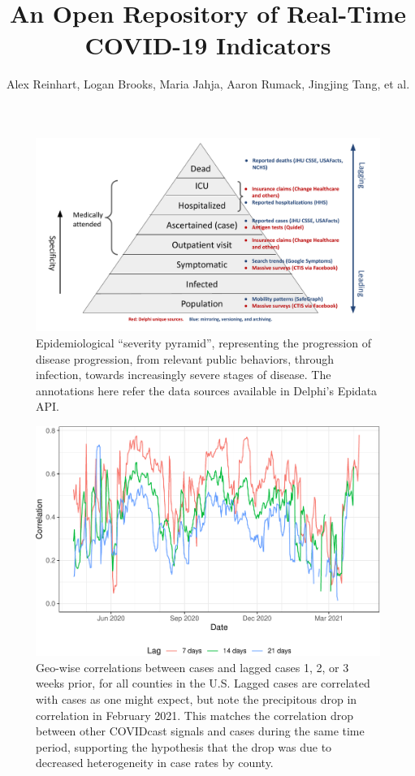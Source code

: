 \documentclass[9pt,twoside,lineno]{pnas-new}
\title{An Open Repository of Real-Time COVID-19 Indicators}
\author{Alex Reinhart, Logan Brooks, Maria Jahja, Aaron Rumack, Jingjing Tang,
  et al.}
\begin{document}
\maketitle

\begin{figure}
\includegraphics[width=\textwidth]{fig/severity-pyramid.pdf}
\caption{Epidemiological ``severity pyramid'', representing the progression of disease progression, from relevant public behaviors, through infection, towards increasingly severe stages of disease. The annotations here refer the data sources available in Delphi's Epidata API.}
\label{fig:severity-pyramid}
\end{figure}

\clearpage

\begin{figure}

{\centering \includegraphics[width=\textwidth]{fig/case-correlation-lagged-plot-1} 

}

\caption{Geo-wise correlations between cases and lagged cases 1, 2, or 3 weeks prior, for all counties in the U.S. Lagged cases are correlated with cases as one might expect, but note the precipitous drop in correlation in February 2021. This matches the correlation drop between other COVIDcast signals and cases during the same time period, supporting the hypothesis that the drop was due to decreased heterogeneity in case rates by county.}\label{fig:case-correlation-lagged-plot}
\end{figure}
\end{document}
